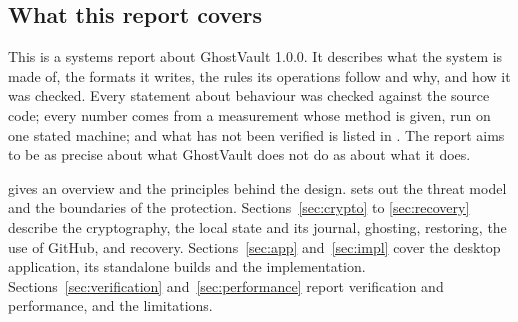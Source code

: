 \subsection{What this report covers}
This is a systems report about GhostVault 1.0.0. It describes what the system is made of, the
formats it writes, the rules its operations follow and why, and how it was checked. Every
statement about behaviour was checked against the source code; every number comes from a
measurement whose method is given, run on one stated machine; and what has not been verified is
listed in . The report aims to be as precise about what GhostVault does not do
as about what it does.

 gives an overview and  the principles behind the
design.  sets out the threat model and the boundaries of the protection.
Sections~\ref{sec:crypto} to \ref{sec:recovery} describe the cryptography, the local state and
its journal, ghosting, restoring, the use of GitHub, and recovery.
Sections~\ref{sec:app} and~\ref{sec:impl} cover the desktop application, its standalone builds and
the implementation. Sections~\ref{sec:verification} and~\ref{sec:performance} report verification
and performance, and  the limitations.
